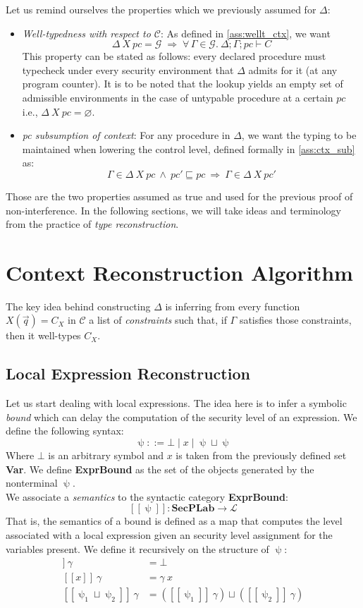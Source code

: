 \documentclass[12pt,a4paper,twoside]{book}
\newcommand{\llbracket}{[\![}
\newcommand{\rrbracket}{]\!]}
\newcommand{\MCL}{\mathscr{L}}
\begin{document}
Let us remind ourselves the properties which we previously assumed for $\Delta$:
\begin{itemize}
\item \emph{Well-typedness with respect to $\mathscr{C}$}: As defined in \ref{ass:wellt_ctx}, we want
$$
\Delta~X~pc = \mathcal{G}
\;\Longrightarrow\;
\forall\,\Gamma \in \mathcal{G}.\ \Delta;\Gamma;pc \vdash C
$$
This property can be stated as follows: every declared procedure must typecheck under every security environment that \(\Delta\) admits for it (at any program counter). It is to be noted that the lookup yields an empty set of admissible environments in the case of untypable procedure at a certain $pc$ i.e., \(\Delta~X~pc=\varnothing\).
\item \emph{pc subsumption of context}: For any procedure in $\Delta$, we want the typing to be maintained when lowering the control level, defined formally in \ref{ass:ctx_sub} as:
$$
  \Gamma \in \Delta~X~pc\ \wedge\ pc' \sqsubseteq pc
  \ \Longrightarrow\
  \Gamma \in \Delta~X~pc'
$$
\end{itemize}
Those are the two properties assumed as true and used for the previous proof of non-interference. In the following sections, we will take ideas and terminology from the practice of \emph{type reconstruction}\cite{pierce2002types}.

\section{Context Reconstruction Algorithm}
The key idea behind constructing $\Delta$ is inferring from every function $X(\vec{q}) = C_X$ in $\mathscr{C}$ a list of \emph{constraints} such that, if $\Gamma$ satisfies those constraints, then it well-types $C_X$.

\subsection{Local Expression Reconstruction}
Let us start dealing with local expressions. The idea here is to infer a symbolic \emph{bound} which can delay the computation of the security level of an expression. We define the following syntax:
$$
\uppsi ::= \bot \mid x \mid \uppsi \sqcup \uppsi
$$
Where $\bot$ is an arbitrary symbol and $x$ is taken from the previously defined set \textbf{Var}. We define \textbf{ExprBound} as the set of the objects generated by the nonterminal $\uppsi$.\\
We associate a \emph{semantics} to the syntactic category \textbf{ExprBound}:
$$\llbracket \uppsi \rrbracket: \textbf{SecPLab} \rightarrow \MCL$$
That is, the semantics of a bound is defined as a map that computes the level associated with a local expression given an security level assignment for the variables present. We define it recursively on the structure of $\uppsi$:
\begin{align*}
\llbracket \bot \rrbracket~\gamma &= \bot\\
\llbracket x \rrbracket~\gamma &= \gamma~x\\
\llbracket \uppsi_1 \sqcup \uppsi_2 \rrbracket~\gamma &= (\llbracket \uppsi_1 \rrbracket~\gamma) \sqcup (\llbracket \uppsi_2 \rrbracket~\gamma)
\end{align*}
\end{document}
